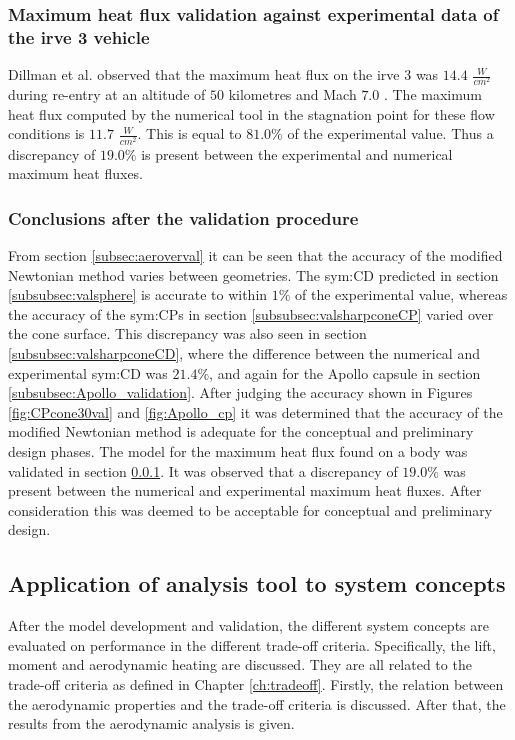 \subsubsection{Maximum heat flux validation against experimental data of the \gls{irve} 3 vehicle}
\label{subsubsec:heatvalidation}
Dillman et al. observed that the maximum heat flux on the \acrfull{irve} 3 was $14.4$ $\frac{W}{cm^{2}}$ during re-entry at an altitude of $50$ kilometres and Mach $7.0$ \cite{Dillman2012}. The maximum heat flux computed by the numerical tool in the stagnation point for these flow conditions is $11.7$ $\frac{W}{cm^{2}}$. This is equal to $81.0\%$ of the experimental value. Thus a discrepancy of $19.0\%$ is present between the experimental and numerical maximum heat fluxes.

\subsubsection{Conclusions after the validation procedure}
\label{subsec:validconclusions}
From section \ref{subsec:aeroverval} it can be seen that the accuracy of the modified Newtonian method varies between geometries. The \gls{sym:CD} predicted in section \ref{subsubsec:valsphere} is accurate to within $1\%$ of the experimental value, whereas the accuracy of the \glspl{sym:CP} in section \ref{subsubsec:valsharpconeCP} varied over the cone surface. This discrepancy was also seen in section \ref{subsubsec:valsharpconeCD}, where the difference between the numerical and experimental \gls{sym:CD} was $21.4\%$, and again for the Apollo capsule in section \ref{subsubsec:Apollo_validation}. After judging the accuracy shown in Figures \ref{fig:CPcone30val} and \ref{fig:Apollo_cp} it was determined that the accuracy of the modified Newtonian method is adequate for the conceptual and preliminary design phases.
The model for the maximum heat flux found on a body was validated in section \ref{subsubsec:heatvalidation}. It was observed that a discrepancy of $19.0\%$ was present between the numerical and experimental maximum heat fluxes. After consideration this was deemed to be acceptable for conceptual and preliminary design.

\subsection{Application of analysis tool to system concepts}
\label{subsec:appaeroanal}
After the model development and validation, the different system concepts are evaluated on performance in the different trade-off criteria. Specifically, the lift, moment and aerodynamic heating are discussed. They are all related to the trade-off criteria as defined in Chapter \ref{ch:tradeoff}. Firstly, the relation between the aerodynamic properties and the trade-off criteria is discussed. After that, the results from the aerodynamic analysis is given.

